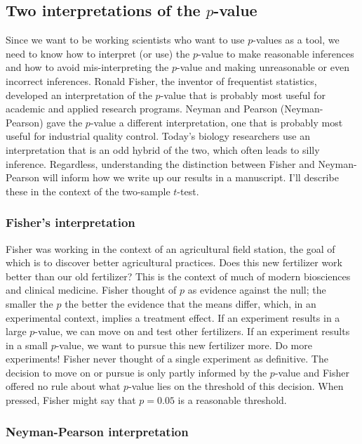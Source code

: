 \documentclass[]{book}
\begin{document}
\subsection{\texorpdfstring{Two interpretations of the
\(p\)-value}{Two interpretations of the p-value}}\label{two-interpretations-of-the-p-value}

Since we want to be working scientists who want to use \(p\)-values as a
tool, we need to know how to interpret (or use) the \(p\)-value to make
reasonable inferences and how to avoid mis-interpreting the \(p\)-value
and making unreasonable or even incorrect inferences. Ronald Fisher, the
inventor of frequentist statistics, developed an interpretation of the
\(p\)-value that is probably most useful for academic and applied
research programs. Neyman and Pearson (Neyman-Pearson) gave the
\(p\)-value a different interpretation, one that is probably most useful
for industrial quality control. Today's biology researchers use an
interpretation that is an odd hybrid of the two, which often leads to
silly inference. Regardless, understanding the distinction between
Fisher and Neyman-Pearson will inform how we write up our results in a
manuscript. I'll describe these in the context of the two-sample
\(t\)-test.

\subsubsection{Fisher's interpretation}\label{fishers-interpretation}

Fisher was working in the context of an agricultural field station, the
goal of which is to discover better agricultural practices. Does this
new fertilizer work better than our old fertilizer? This is the context
of much of modern biosciences and clinical medicine. Fisher thought of
\(p\) as evidence against the null; the smaller the \(p\) the better the
evidence that the means differ, which, in an experimental context,
implies a treatment effect. If an experiment results in a large
\(p\)-value, we can move on and test other fertilizers. If an experiment
results in a small \(p\)-value, we want to pursue this new fertilizer
more. Do more experiments! Fisher never thought of a single experiment
as definitive. The decision to move on or pursue is only partly informed
by the \(p\)-value and Fisher offered no rule about what \(p\)-value
lies on the threshold of this decision. When pressed, Fisher might say
that \(p=0.05\) is a reasonable threshold.

\subsubsection{Neyman-Pearson
interpretation}\label{neyman-pearson-interpretation}
\end{document}
